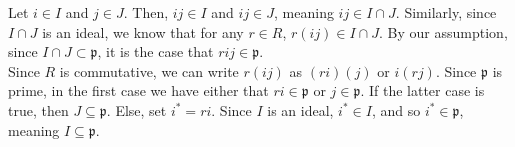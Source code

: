 \documentclass[8pt]{extarticle}
\begin{document}
  Let $i\in I$ and $j\in J$. Then, $ij\in I$ and $ij\in J$, meaning $ij\in I\cap J$. Similarly, since $I\cap J$ is an ideal, we know that for any $r\in R$, $r(ij)\in I\cap J$. By our assumption, since $I\cap J\subset \mathfrak{p}$, it is the case that $rij\in \mathfrak{p}$.\\

  Since $R$ is commutative, we can write $r(ij)$ as $(ri)(j)$ or $i(rj)$. Since $\mathfrak{p}$ is prime, in the first case we have either that $ri\in \mathfrak{p}$ or $j\in \mathfrak{p}$. If the latter case is true, then $J\subseteq \mathfrak{p}$. Else, set $i^{\ast} = ri$. Since $I$ is an ideal, $i^{\ast}\in I$, and so $i^{\ast}\in \mathfrak{p}$, meaning $I\subseteq \mathfrak{p}$.
\end{document}

